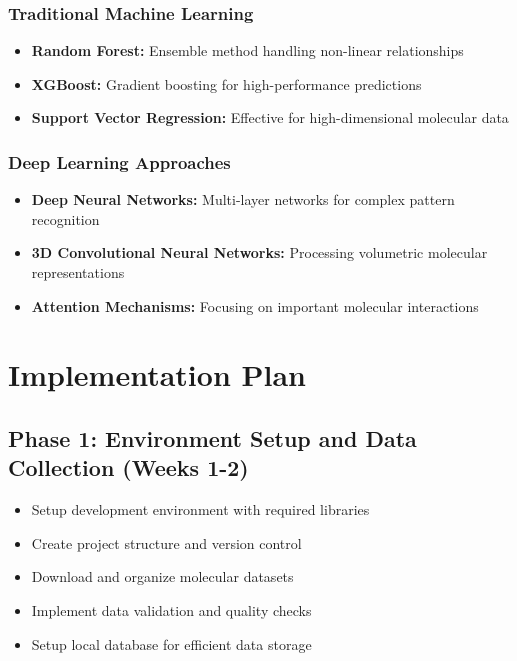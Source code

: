 \documentclass[12pt,a4paper]{article}
\begin{document}
\subsubsection{Traditional Machine Learning}
\begin{itemize}
    \item \textbf{Random Forest:} Ensemble method handling non-linear relationships
    \item \textbf{XGBoost:} Gradient boosting for high-performance predictions
    \item \textbf{Support Vector Regression:} Effective for high-dimensional molecular data
\end{itemize}

\subsubsection{Deep Learning Approaches}
\begin{itemize}
    \item \textbf{Deep Neural Networks:} Multi-layer networks for complex pattern recognition
    \item \textbf{3D Convolutional Neural Networks:} Processing volumetric molecular representations
    \item \textbf{Attention Mechanisms:} Focusing on important molecular interactions
\end{itemize}

\section{Implementation Plan}

\subsection{Phase 1: Environment Setup and Data Collection (Weeks 1-2)}
\begin{itemize}
    \item Setup development environment with required libraries
    \item Create project structure and version control
    \item Download and organize molecular datasets
    \item Implement data validation and quality checks
    \item Setup local database for efficient data storage
\end{itemize}
\end{document}
